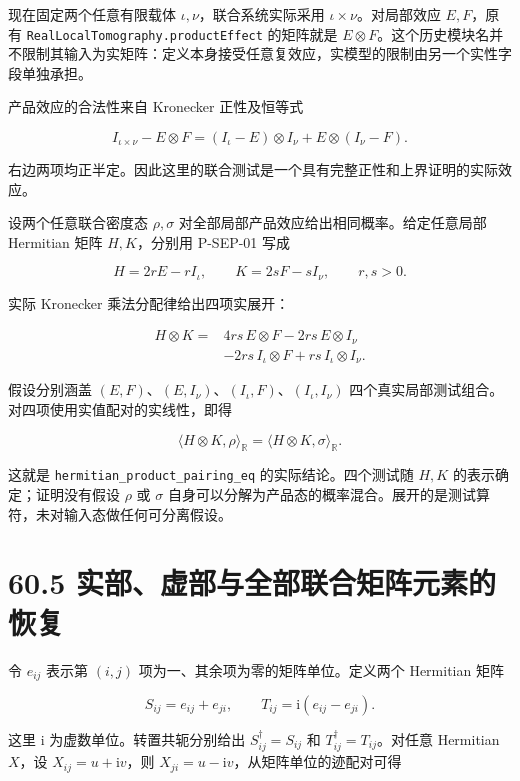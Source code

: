 \documentclass[
  11pt,
  oneside]{book}
\begin{document}
现在固定两个任意有限载体 \(\iota,\nu\)，联合系统实际采用
\(\iota\times\nu\)。对局部效应 \(E,F\)，原有
\texttt{RealLocalTomography.productEffect} 的矩阵就是
\(E\otimes F\)。这个历史模块名并不限制其输入为实矩阵：定义本身接受任意复效应，实模型的限制由另一个实性字段单独承担。

产品效应的合法性来自 Kronecker 正性及恒等式

\[
I_{\iota\times\nu}-E\otimes F
=(I_\iota-E)\otimes I_\nu
+E\otimes(I_\nu-F).
\]

右边两项均正半定。因此这里的联合测试是一个具有完整正性和上界证明的实际效应。

设两个任意联合密度态 \(\rho,\sigma\)
对全部局部产品效应给出相同概率。给定任意局部 Hermitian 矩阵
\(H,K\)，分别用 P-SEP-01 写成

\[
H=2rE-rI_\iota,\qquad K=2sF-sI_\nu,
\qquad r,s>0.
\]

实际 Kronecker 乘法分配律给出四项实展开：

\[
\begin{aligned}
H\otimes K={}&4rs\,E\otimes F
-2rs\,E\otimes I_\nu\\
&-2rs\,I_\iota\otimes F
+rs\,I_\iota\otimes I_\nu.
\end{aligned}
\]

假设分别涵盖
\((E,F)\)、\((E,I_\nu)\)、\((I_\iota,F)\)、\((I_\iota,I_\nu)\)
四个真实局部测试组合。对四项使用实值配对的实线性，即得

\[
\langle H\otimes K,\rho\rangle_{\mathbb R}
=\langle H\otimes K,\sigma\rangle_{\mathbb R}.
\]

这就是 \texttt{hermitian\_\allowbreak product\_\allowbreak pairing\_\allowbreak eq} 的实际结论。四个测试随
\(H,K\) 的表示确定；证明没有假设 \(\rho\) 或 \(\sigma\)
自身可以分解为产品态的概率混合。展开的是测试算符，未对输入态做任何可分离假设。

\hypertarget{ux5b9eux90e8ux865aux90e8ux4e0eux5168ux90e8ux8054ux5408ux77e9ux9635ux5143ux7d20ux7684ux6062ux590d}{%
\section{60.5
实部、虚部与全部联合矩阵元素的恢复}\label{ux5b9eux90e8ux865aux90e8ux4e0eux5168ux90e8ux8054ux5408ux77e9ux9635ux5143ux7d20ux7684ux6062ux590d}}

令 \(e_{ij}\) 表示第 \((i,j)\) 项为一、其余项为零的矩阵单位。定义两个
Hermitian 矩阵

\[
S_{ij}=e_{ij}+e_{ji},\qquad
T_{ij}=\mathrm i(e_{ij}-e_{ji}).
\]

这里 \(\mathrm i\) 为虚数单位。转置共轭分别给出
\(S_{ij}^\dagger=S_{ij}\) 和 \(T_{ij}^\dagger=T_{ij}\)。对任意 Hermitian
\(X\)，设 \(X_{ij}=u+\mathrm i v\)，则
\(X_{ji}=u-\mathrm i v\)，从矩阵单位的迹配对可得
\end{document}
